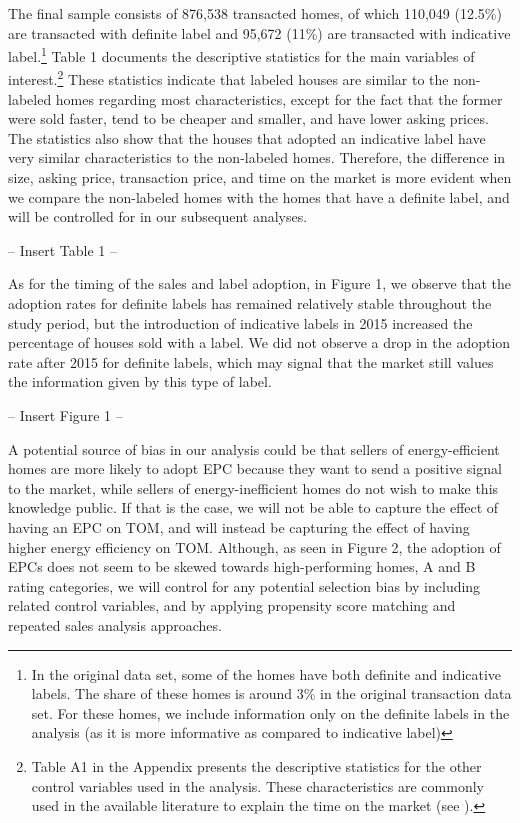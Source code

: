 \documentclass[12pt]{article}
\begin{document}
The final sample consists of 876,538 transacted homes, of which 110,049 (12.5\%) are transacted with definite label and 95,672 (11\%) are transacted with indicative label.\footnote{In the original data set, some of the homes have both definite and indicative labels. The share of these homes is around 3\% in the original transaction data set. For these homes, we include information only on the definite labels in the analysis (as it is more informative as compared to indicative label)} Table 1 documents the descriptive statistics for the main variables of interest.\footnote{Table A1 in the Appendix presents the descriptive statistics for the other control variables used in the analysis. These characteristics are commonly used in the available literature to explain the time on the market (see \cite{sirmans2005composition,tucker2013days,merlo2004bargaining}).} These statistics indicate that labeled houses are similar to the non-labeled homes regarding most characteristics, except for the fact that the former were sold faster, tend to be cheaper and smaller, and have lower asking prices. The statistics also show that the houses that adopted an indicative label have very similar characteristics to the non-labeled homes. Therefore, the difference in size, asking price, transaction price, and time on the market is more evident when we compare the non-labeled homes with the homes that have a definite label, and will be controlled for in our subsequent analyses.

\begin{center}
-- Insert Table 1 --
\end{center}

As for the timing of the sales and label adoption, in Figure 1, we observe that the adoption rates for definite labels has remained relatively stable throughout the study period, but the introduction of indicative labels in 2015 increased the percentage of houses sold with a label. We did not observe a drop in the adoption rate after 2015 for definite labels, which may signal that the market still values the information given by this type of label.

\begin{center}
-- Insert Figure 1 --
\end{center}

A potential source of bias in our analysis could be that sellers of energy-efficient homes are more likely to adopt EPC because they want to send a positive signal to the market, while sellers of energy-inefficient homes do not wish to make this knowledge public. If that is the case, we will not be able to capture the effect of having an EPC on TOM, and will instead be capturing the effect of having higher energy efficiency on TOM. Although, as seen in Figure 2, the adoption of EPCs does not seem to be skewed towards high-performing homes, A and B rating categories, we will control for any potential selection bias by including related control variables, and by applying propensity score matching and repeated sales analysis approaches.
\end{document}
